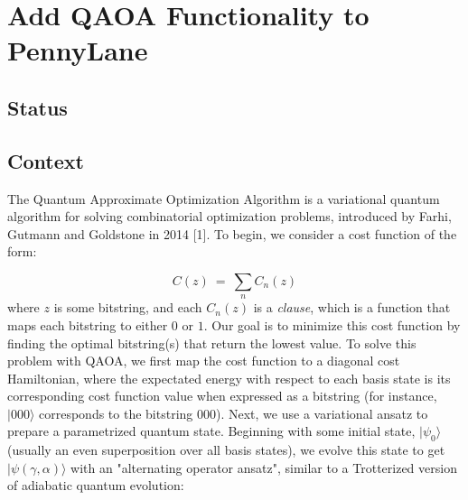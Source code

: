 \documentclass{article}
\begin{document}
\section{Add QAOA Functionality to PennyLane}

\subsection{Status}

\subsection{Context}

The Quantum Approximate Optimization Algorithm is a variational quantum algorithm for solving combinatorial 
optimization problems, introduced by Farhi, Gutmann and Goldstone in 2014 [1].
\newline\newline
\noindent
To begin, we consider a cost function of the form:

\begin{equation}
	C(z) \ = \ \displaystyle\sum_{n} C_n(z)
\end{equation}
\noindent
where $z$ is some bitstring, and each $C_n(z)$ is a \textit{clause}, which is a function that maps 
each bitstring to either $0$ or $1$. Our goal is to minimize this cost function by finding the 
optimal bitstring(s) that return the lowest value.
\newline\newline
\noindent
To solve this problem with QAOA, we first map the cost function 
to a diagonal cost Hamiltonian, where the expectated energy with respect to 
each basis state is its corresponding cost function value when expressed as a bitstring 
(for instance, $|000\rangle$ corresponds to the bitstring $000$).
\newline\newline
\noindent
Next, we use a variational ansatz to prepare a parametrized quantum state.
Beginning with some initial state, $|\psi_0\rangle$ (usually an 
even superposition over all basis states), we evolve this state to get $|\psi(\gamma, \alpha)\rangle$ with an 
"alternating operator ansatz", similar to a Trotterized version of adiabatic quantum evolution:
\end{document}
